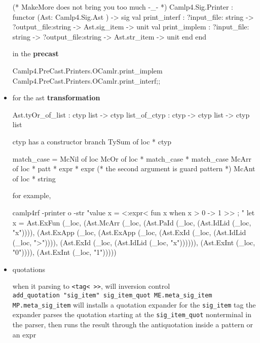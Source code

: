 \begin{itemize}
\begin{bluecode}
(* MakeMore does not bring you too much -_- *)
Camlp4.Sig.Printer :
  functor (Ast: Camlp4.Sig.Ast ) ->
    sig
      val print_interf :
        ?input_file: string -> ?output_file:string -> Ast.sig_item -> unit 
      val print_implem :
        ?input_file: string -> ?output_file:string -> Ast.str_item -> unit          end 
  end

\end{bluecode}


  in the {\bf precast}
  

\begin{bluecode}
Camlp4.PreCast.Printers.OCamlr.print_implem
Camlp4.PreCast.Printers.OCamlr.print_interf;;
\end{bluecode}


\item for the ast {\bf transformation }


\begin{bluecode}
Ast.tyOr_of_list : ctyp list -> ctyp
list_of_ctyp : ctyp -> ctyp list -> ctyp list
\end{bluecode}


  ctyp has a constructor branch   TySum of loc * ctyp


\begin{bluecode}
match_case =
  McNil of loc
  McOr of loc * match_case * match_case
  McArr  of loc * patt * expr * expr (* the second argument is guard pattern *)
  McAnt of loc * string 
\end{bluecode}


for example,


\begin{bluecode}
camlp4rf -printer o -str "value x = <:expr< fun x when x > 0 -> 1 >> ; "
let x =
  Ast.ExFun (_loc,
    (Ast.McArr (_loc, (Ast.PaId (_loc, (Ast.IdLid (_loc, "x")))),
       (Ast.ExApp (_loc,
          (Ast.ExApp (_loc, (Ast.ExId (_loc, (Ast.IdLid (_loc, ">")))),
             (Ast.ExId (_loc, (Ast.IdLid (_loc, "x")))))),
          (Ast.ExInt (_loc, "0")))),
       (Ast.ExInt (_loc, "1")))))
  
\end{bluecode}


     
\item quotations


\begin{bluecode}
\end{bluecode}


  when it parsing to \verb|<tag< >>|, will inversion control \\
   \verb|add_quotation "sig_item" sig_item_quot ME.meta_sig_item MP.meta_sig_item|
   will  installs a quotation expander for the \verb|sig_item| tag
   the expander parses the quotation starting at the \verb|sig_item_quot|
   nonterminal in the parser, then runs the result through the antiquotation
   inside a pattern or an expr 


\end{itemize}
